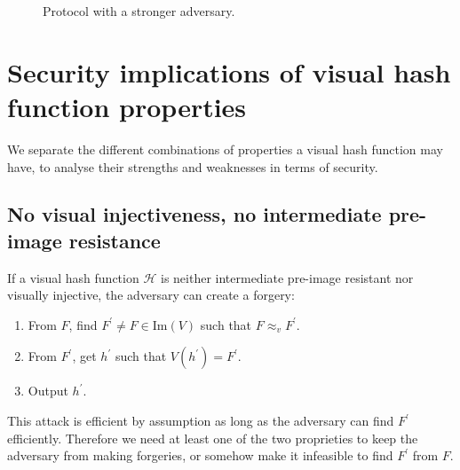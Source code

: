 \documentclass{article}
\newcommand{\vis}{\approx_v}
\newcommand{\hh}{\mathcal H}
\begin{document}
\begin{figure}[h]
    \centering
    \caption{Protocol with a stronger adversary.}
    \label{fig:front_adv}
\end{figure}


\section{Security implications of visual hash function properties}
We separate the different combinations of properties a visual hash function may have, to analyse their strengths and weaknesses in terms of security.
 \subsection{No visual injectiveness, no intermediate pre-image resistance}
\label{section:forge}
If a visual hash function $\hh$ is neither intermediate pre-image resistant nor visually injective, the adversary can create a forgery:

\begin{enumerate}
    \item From $F$, find $F^\prime \neq F \in \text{Im}(V)$ such that $F \vis F^\prime$.
    \item From $F^\prime$, get $h^\prime$ such that $V(h^\prime) = F^\prime$.
    \item Output $h^\prime$.
\end{enumerate}
This attack is efficient by assumption as long as the adversary can find $F^\prime$ efficiently. Therefore we need at least one of the two proprieties to keep the adversary from making forgeries, or somehow make it infeasible to find $F^\prime$ from $F$.
\end{document}
